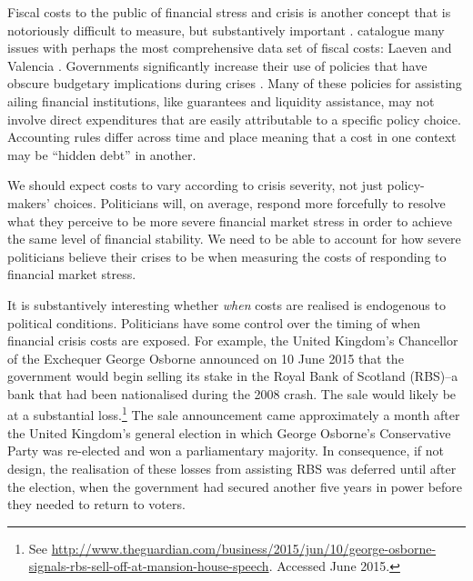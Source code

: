 \documentclass[]{article}
\begin{document}
Fiscal costs to the public of financial stress and crisis is another concept that is notoriously difficult to measure, but substantively important \citep[see][]{reinhartRogoff2011}. \cite{GandrudHallerberg2015} catalogue many issues with perhaps the most comprehensive data set of fiscal costs: Laeven and Valencia \citeyearpar[and their predecessors]{laeven2013}. Governments significantly increase their use of policies that have obscure budgetary implications during crises \citep{seiferling2015}. Many of these policies for assisting ailing financial institutions, like guarantees and liquidity assistance, may not involve direct expenditures that are easily attributable to a specific policy choice. Accounting rules differ across time and place \citep{gandrudHallerbergWEP} meaning that a cost in one context may be ``hidden debt'' \citep{reinhartRogoff2011} in another.

We should expect costs to vary according to crisis severity, not just policy-makers' choices. Politicians will, on average, respond more forcefully to resolve what they perceive to be more severe financial market stress in order to achieve the same level of financial stability. We need to be able to account for how severe politicians believe their crises to be when measuring the costs of responding to financial market stress. %

It is substantively interesting whether \emph{when} costs are realised is endogenous to political conditions. Politicians have some control over the timing of when financial crisis costs are exposed. For example, the United Kingdom's Chancellor of the Exchequer George Osborne announced on 10 June 2015 that the government would begin selling its stake in the Royal Bank of Scotland (RBS)--a bank that had been nationalised during the 2008 crash. The sale would likely be at a substantial loss.\footnote{See \url{http://www.theguardian.com/business/2015/jun/10/george-osborne-signals-rbs-sell-off-at-mansion-house-speech}. Accessed June 2015.} The sale announcement came approximately a month after the United Kingdom's general election in which George Osborne's Conservative Party was re-elected and won a parliamentary majority. In consequence, if not design, the realisation of these losses from assisting RBS was deferred until after the election, when the government had secured another five years in power before they needed to return to voters.
\end{document}
